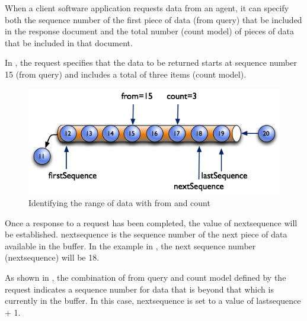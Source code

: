 \documentclass{mtconnect}	%
\begin{document}
\FloatBarrier

When a client software application requests data from an \gls{agent}, it can specify both the \gls{sequence number} of the first piece of data (\gls{from query}) that \MUST be included in the \gls{response document} and the total number (\gls{count model}) of pieces of data that \SHOULD be included in that document.

In , the request specifies that the data to be returned starts at \gls{sequence number} 15 (\gls{from query}) and includes a total of three items (\gls{count model}).  

\begin{figure}[ht]
  \centering
  \includegraphics[width=1.0\textwidth]{figures/identifying-the-range-of-data-with-from-and-count.png}
  \caption{Identifying the range of data with from and count}
  \label{fig:identifying-the-range-of-data-with-from-and-count}
\end{figure}

\FloatBarrier


Once a \gls{response} to a \gls{request} has been completed, the value of \gls{nextsequence} will be established.  \gls{nextsequence} is the \gls{sequence number} of the next piece of data available in the \gls{buffer}.  In the example in , the next \gls{sequence number} (\gls{nextsequence}) will be 18.

As shown in , the combination of \gls{from query} and \gls{count model} defined by the \gls{request} indicates a \gls{sequence number} for data that is beyond that which is currently in the \gls{buffer}.  In this case, \gls{nextsequence} is set to a value of \gls{lastsequence} + 1.  
\end{document}
